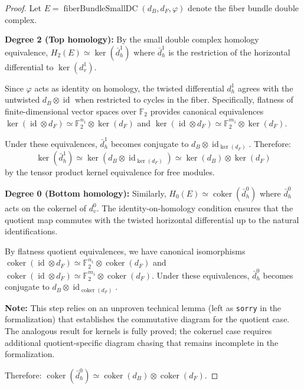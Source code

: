\documentclass[11pt]{article}
\theoremstyle{plain}
\theoremstyle{definition}
\theoremstyle{remark}
\renewcommand{\ker}{\operatorname{ker}}
\begin{document}
\begin{proof}
Let $E = \operatorname{fiberBundleSmallDC}(d_B, d_F, \varphi)$ denote the fiber bundle double complex.

\textbf{Degree 2 (Top homology):} By the small double complex homology equivalence, $H_2(E) \simeq \ker(\bar{d}_h^1)$ where $\bar{d}_h^1$ is the restriction of the horizontal differential to $\ker(d_v^1)$. 

Since $\varphi$ acts as identity on homology, the twisted differential $d_h^1$ agrees with the untwisted $d_B \otimes \operatorname{id}$ when restricted to cycles in the fiber. Specifically, flatness of finite-dimensional vector spaces over $\mathbb{F}_2$ provides canonical equivalences $\ker(\operatorname{id} \otimes d_F) \simeq \mathbb{F}_2^{n_1} \otimes \ker(d_F)$ and $\ker(\operatorname{id} \otimes d_F) \simeq \mathbb{F}_2^{m_1} \otimes \ker(d_F)$. 

Under these equivalences, $\bar{d}_h^1$ becomes conjugate to $d_B \otimes \operatorname{id}_{\ker(d_F)}$. Therefore:
\[
\ker(\bar{d}_h^1) \simeq \ker(d_B \otimes \operatorname{id}_{\ker(d_F)}) \simeq \ker(d_B) \otimes \ker(d_F)
\]
by the tensor product kernel equivalence for free modules.

\textbf{Degree 0 (Bottom homology):} Similarly, $H_0(E) \simeq \operatorname{coker}(\bar{d}_h^0)$ where $\bar{d}_h^0$ acts on the cokernel of $d_v^0$. The identity-on-homology condition ensures that the quotient map commutes with the twisted horizontal differential up to the natural identifications.

By flatness quotient equivalences, we have canonical isomorphisms $\operatorname{coker}(\operatorname{id} \otimes d_F) \simeq \mathbb{F}_2^{n_1} \otimes \operatorname{coker}(d_F)$ and $\operatorname{coker}(\operatorname{id} \otimes d_F) \simeq \mathbb{F}_2^{m_1} \otimes \operatorname{coker}(d_F)$. Under these equivalences, $\bar{d}_h^0$ becomes conjugate to $d_B \otimes \operatorname{id}_{\operatorname{coker}(d_F)}$.

\textbf{Note:} This step relies on an unproven technical lemma (left as \texttt{sorry} in the formalization) that establishes the commutative diagram for the quotient case. The analogous result for kernels is fully proved; the cokernel case requires additional quotient-specific diagram chasing that remains incomplete in the formalization.

Therefore: $\operatorname{coker}(\bar{d}_h^0) \simeq \operatorname{coker}(d_B) \otimes \operatorname{coker}(d_F)$.


\end{proof}
\end{document}
